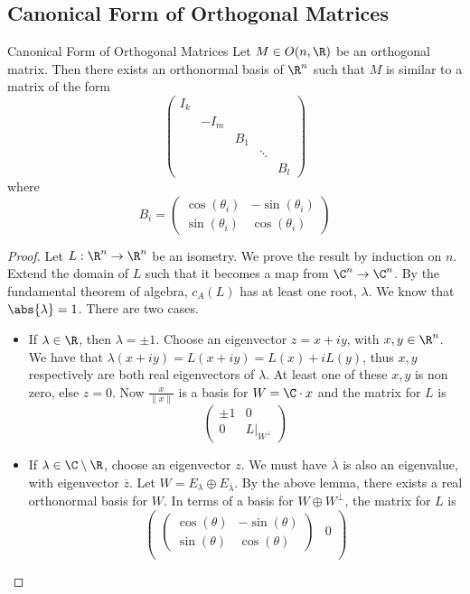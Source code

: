 \documentclass[a4paper]{article}
\begin{document}
\subsection{Canonical Form of Orthogonal Matrices}
\begin{thm}{Canonical Form of Orthogonal Matrices}{} Let $M\in O(n,\R)$ be an orthogonal matrix. Then there exists an orthonormal basis of $\R^n$ such that $M$ is similar to a matrix of the form $$\begin{pmatrix}
I_k &&&&\\
&-I_m&&&\\
&&B_1&&\\
&&&\ddots&\\
&&&&B_l
\end{pmatrix}$$ where $$B_i=\begin{pmatrix}\cos(\theta_i) & -\sin(\theta_i) \\
\sin(\theta_i) & \cos(\theta_i)
\end{pmatrix}$$\tcbline
\begin{proof}
Let $L:\R^n\to\R^n$ be an isometry. We prove the result by induction on $n$. Extend the domain of $L$ such that it becomes a map from $\C^n\to\C^n$. By the fundamental theorem of algebra, $c_A(L)$ has at least one root, $\lambda$. We know that $\abs{\lambda}=1$. There are two cases. 
\begin{itemize}
\item If $\lambda\in\R$, then $\lambda=\pm1$. Choose an eigenvector $z=x+iy$, with $x,y\in\R^n$. We have that $\lambda(x+iy)=L(x+iy)=L(x)+iL(y)$, thus $x,y$ respectively are both real eigenvectors of $\lambda$. At least one of these $x,y$ is non zero, else $z=0$. Now $\frac{x}{\|x\|}$ is a basis for $W=\C\cdot x$ and the matrix for $L$ is $$\begin{pmatrix}
\pm1 & 0\\
0 & L|_{W^\perp}
\end{pmatrix}$$
\item If $\lambda\in\C\setminus\R$, choose an eigenvector $z$. We must have $\overline{\lambda}$ is also an eigenvalue, with eigenvector $\overline{z}$. Let $W=E_{\lambda}\oplus E_{\overline{\lambda}}$. By the above lemma, there exists a real orthonormal basis for $W$. In terms of a basis for $W\oplus W^\perp$, the matrix for $L$ is $$\begin{pmatrix}
\begin{pmatrix}
\cos(\theta) & -\sin(\theta) \\
\sin(\theta) & \cos(\theta)
\end{pmatrix} & 0\\

\end{pmatrix}$$
\end{itemize}
\end{proof}
\end{thm}
\end{document}
